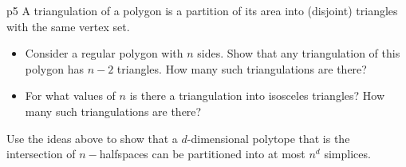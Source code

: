 \documentclass[a4paper, 11pt]{article}
\begin{document}
\begin{problem}{%
}{p5%
}
A triangulation of a polygon is a partition of its area into (disjoint) triangles with the same vertex set. \begin{itemize}[label=$\bullet$]
	\item Consider a regular polygon with $n$ sides. Show that any triangulation of this polygon has $n-2$ triangles. How many such triangulations are there?
	\item For what values of $n$ is there a triangulation into isosceles triangles? How many such triangulations are there?
\end{itemize}
Use the ideas above to show that a $d$-dimensional polytope that is the intersection of $n-$halfspaces can be partitioned into at most $n^d$ simplices.
\end{problem}
\end{document}
